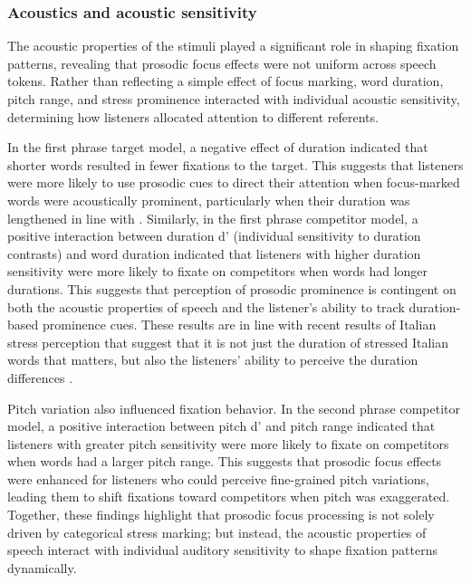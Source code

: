 \subsubsection{Acoustics and acoustic sensitivity}

The acoustic properties of the stimuli played a significant role in shaping fixation patterns, revealing that prosodic focus effects were not uniform across speech tokens. Rather than reflecting a simple effect of focus marking, word duration, pitch range, and stress prominence interacted with individual acoustic sensitivity, determining how listeners allocated attention to different referents.

In the first phrase target model, a negative effect of duration indicated that shorter words resulted in fewer fixations to the target. This suggests that listeners were more likely to use prosodic cues to direct their attention when focus-marked words were acoustically prominent, particularly when their duration was lengthened in line with \cite{Breen2010,Ge2021,ge2021comprehension}. Similarly, in the first phrase competitor model, a positive interaction between duration d$’$ (individual sensitivity to duration contrasts) and word duration indicated that listeners with higher duration sensitivity were more likely to fixate on competitors when words had longer durations. This suggests that perception of prosodic prominence is contingent on both the acoustic properties of speech and the listener’s ability to track duration-based prominence cues. These results are in line with recent results of Italian stress perception that suggest that it is not just the duration of stressed Italian words that matters, but also the listeners' ability to perceive the duration differences \citep{ppcc}.

Pitch variation also influenced fixation behavior. In the second phrase competitor model, a positive interaction between pitch d’ and pitch range  indicated that listeners with greater pitch sensitivity were more likely to fixate on competitors when words had a larger pitch range. This suggests that prosodic focus effects were enhanced for listeners who could perceive fine-grained pitch variations, leading them to shift fixations toward competitors when pitch was exaggerated. Together, these findings highlight that prosodic focus processing is not solely driven by categorical stress marking; but instead, the acoustic properties of speech interact with individual auditory sensitivity to shape fixation patterns dynamically. 

